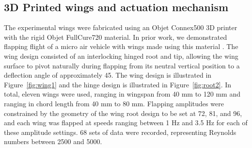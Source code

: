\documentclass{article}
\begin{document}
\subsection*{3D Printed wings and actuation mechanism}
The experimental wings were fabricated using an Objet Connex500 3D printer with
the rigid Objet FullCure720 material. In prior work, we demonstrated flapping
flight of a micro air vehicle with wings made using this material
\cite{richter2011untethered}. The wing design consisted of an interlocking
hinged root and tip, allowing the wing surface to pivot naturally during
flapping from its neutral vertical position to a deflection angle of
approximately 45\textdegree.  The wing design is illustrated in
Figure~\ref{fig:wing1} and the hinge design is illustrated in
Figure~\ref{fig:root2}.  In total, eleven wings were used, ranging in wingspan
from 40 mm to 120 mm and ranging in chord length from 40 mm to 80 mm. Flapping
amplitudes were constrained by the geometry of the wing root design to be set at
72\textdegree, 81\textdegree, and 96\textdegree, and each wing was flapped at
speeds ranging between 1 Hz and 3.5 Hz for each of these amplitude settings.  68
sets of data were recorded, representing Reynolds numbers between 2500 and 5000.
\end{document}
